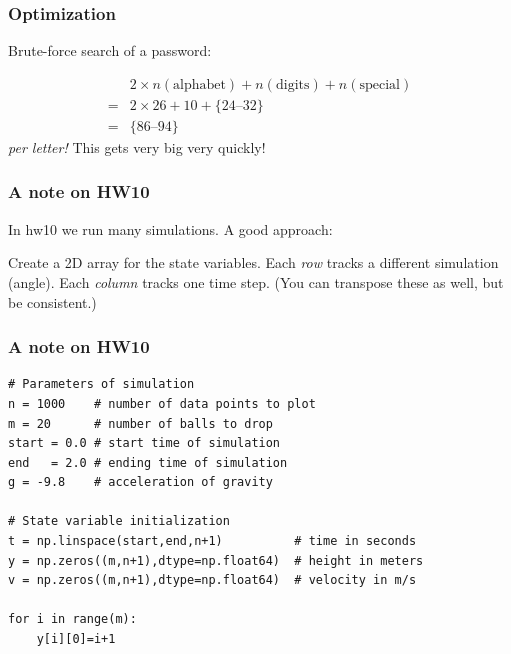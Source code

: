\documentclass[11pt]{beamer}
\begin{document}
\begin{frame}[fragile]
  \frametitle{Optimization}
  \Enlarge

  \begin{enumerate}
  \myitem  Brute-force search of a password: %
  \end{enumerate}
  $$
  \begin{array}{ll}
      & 2 \times n(\textrm{alphabet}) + n(\textrm{digits}) + n(\textrm{special}) \\
    = & 2 \times 26 + 10 + \{24\textrm{--}32\} \\
    = & \{86\textrm{--}94\}
  \end{array}
  $$
  \emph{per letter!}  This gets very big very quickly!
\end{frame}

\begin{frame}[fragile]
  \frametitle{A note on HW10}
  \Enlarge

  \begin{enumerate}
  \myitem  In hw10 we run many simulations.
  \myitem  A good approach:
    \begin{enumerate}
    \mysubitem  Create a 2D array for the state variables.
    \mysubitem  Each \emph{row} tracks a different simulation (angle).
    \mysubitem  Each \emph{column} tracks one time step.
    \mysubitem  (You can transpose these as well, but be consistent.)
    \end{enumerate}
  \end{enumerate}
\end{frame}

\begin{frame}[fragile]
  \frametitle{A note on HW10}

  \begin{Verbatim}
# Parameters of simulation
n = 1000    # number of data points to plot
m = 20      # number of balls to drop
start = 0.0 # start time of simulation
end   = 2.0 # ending time of simulation
g = -9.8    # acceleration of gravity

# State variable initialization
t = np.linspace(start,end,n+1)          # time in seconds
y = np.zeros((m,n+1),dtype=np.float64)  # height in meters
v = np.zeros((m,n+1),dtype=np.float64)  # velocity in m/s

for i in range(m):
    y[i][0]=i+1
  \end{Verbatim}
\end{frame}
\end{document}
